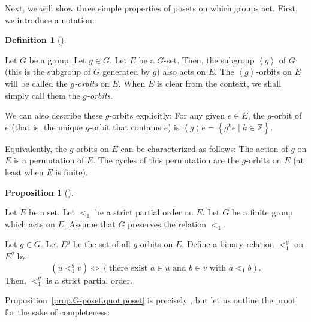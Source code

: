 \documentclass[numbers=enddot,12pt,final,onecolumn,notitlepage,abstracton]{scrartcl}
\theoremstyle{definition}
\newtheorem{prop}[theo]{Proposition}
\newenvironment{proposition}[1][]
{\begin{prop}[#1]\begin{leftbar}}
{\end{leftbar}\end{prop}}
\newtheorem{defi}[theo]{Definition}
\newenvironment{definition}[1][]
{\begin{defi}[#1]\begin{leftbar}}
{\end{leftbar}\end{defi}}
\newcommand{\ZZ}{{\mathbb{Z}}}
\begin{document}
Next, we will show three simple properties of posets on which
groups act. First, we introduce a notation:

\begin{definition}
\label{def.G-poset.g-orbit}
Let $G$ be a group. Let $g \in G$. Let $E$ be a $G$-set.
Then, the subgroup $\left< g \right>$ of $G$ (this is the
subgroup of $G$ generated by $g$) also acts on $E$. The
$\left< g \right>$-orbits on $E$ will be called the
\textit{$g$-orbits} on $E$. When $E$ is clear from the
context, we shall simply call them the
\textit{$g$-orbits}.

We can also describe these $g$-orbits explicitly: For any given
$e \in E$, the $g$-orbit of $e$ (that is, the unique
$g$-orbit that contains $e$) is
$\left< g \right> e = \left\{ g^k e \mid k \in \ZZ \right\}$.

Equivalently, the $g$-orbits on $E$ can be characterized as
follows: The action of $g$ on $E$ is a permutation of $E$.
The cycles of this permutation are the $g$-orbits on $E$
(at least when $E$ is finite).
\end{definition}

\begin{proposition}
\label{prop.G-poset.quot.poset}
Let $E$ be a set. Let $<_1$ be a strict partial order on $E$.
Let $G$ be a finite group which acts on $E$. Assume that $G$ preserves
the relation $<_1$.

Let $g \in G$. Let $E^g$ be the set of all $g$-orbits
on $E$. Define a binary relation $<_1^g$ on $E^g$ by
\[
\left(  u<_{1}^{g}v\right)  \Longleftrightarrow\left(  \text{there exist }a\in
u\text{ and }b\in v\text{ with }a<_{1}b\right)  .
\]
Then, $<_1^g$ is a strict partial order.
\end{proposition}

Proposition~\ref{prop.G-poset.quot.poset} is precisely \cite[Lemma 2.4]{Joch},
but let us outline the proof for the sake of completeness:
\end{document}
